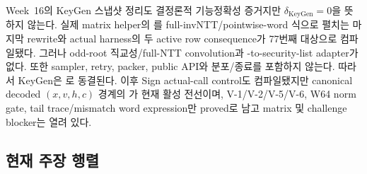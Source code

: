 Week~16의 KeyGen 스냅샷 정리도 결정론적 기능정확성 증거지만
\(\delta_{\mathrm{KeyGen}}=0\)을 뜻하지 않는다. 실제 matrix helper의
를 full-invNTT/pointwise-word 식으로 펼치는 마지막
rewrite와 actual harness의 두 active row consequence가 77번째 대상으로
컴파일됐다. 그러나 odd-root 직교성/full-NTT convolution과
-to-security-list adapter가 없다. 또한 sampler, retry,
packer, public API와 분포/종료를 포함하지 않는다. 따라서 KeyGen은
로 동결된다. 이후 Sign actual-call control도
컴파일됐지만 canonical decoded \((x,v,h,c)\) 경계의
가 현재 활성 전선이며, V-1/V-2/V-5/V-6,
W64 norm gate, tail trace/mismatch word expression만 proved로 남고 matrix 및
challenge blocker는 열려 있다.

\subsection{현재 주장 행렬}

